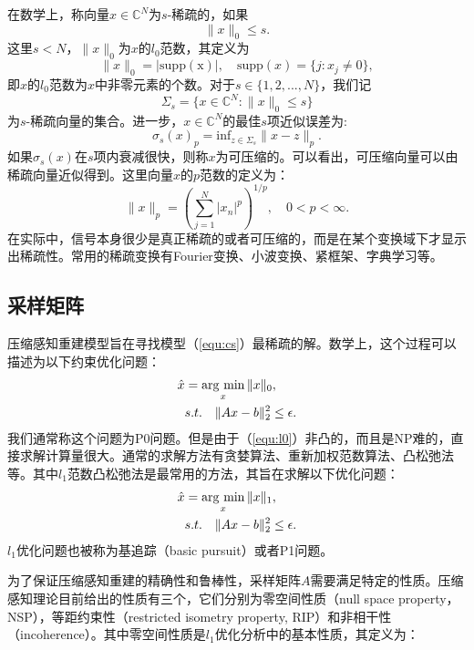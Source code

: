在数学上，称向量$x\in \mathbb{C}^N$为$s$-稀疏的，如果
\begin{equation}
	\|x\|_0 \leq s.
\end{equation}
这里$s<N$，$\|x\|_0$为$x$的$l_0$范数，其定义为
$$\|x\|_0=|\mathrm{supp(x)}|,\quad \mathrm{supp}(x)=\{j: x_j\neq 0\},$$
即$x$的$l_0$范数为$x$中非零元素的个数。对于$s\in \{1,2,...,N\}$，我们记
$$\Sigma_s=\{x\in\mathbb{C}^N: \|x\|_0\leq s\}$$
为$s$-稀疏向量的集合。进一步，$x\in \mathbb{C}^N$的最佳$s$项近似误差为:
$$\sigma_s(x)_p=\mathrm{inf}_{z\in \Sigma_s}\|x-z\|_p.$$
如果$\sigma_s(x)$在$s$项内衰减很快，则称$x$为可压缩的。可以看出，可压缩向量可以由稀疏向量近似得到。这里向量$x$的$p$范数的定义为：
\begin{equation}
	\|x\|_p = (\sum_{j=1}^N|x_n|^p)^{1/p},\quad 0<p<\infty.
\end{equation}
在实际中，信号本身很少是真正稀疏的或者可压缩的，而是在某个变换域下才显示出稀疏性。常用的稀疏变换有Fourier变换、小波变换、紧框架、字典学习等。

\subsection{采样矩阵}
压缩感知重建模型旨在寻找模型（\ref{equ:cs}）最稀疏的解。数学上，这个过程可以描述为以下约束优化问题：
\begin{equation}
\begin{aligned}
	\hat{x}&=\argmin_x \|x\|_0,\\
	&s.t.\quad \|Ax-b\|_2^2 \leq \epsilon.
\end{aligned}
\label{equ:l0}
\end{equation}
我们通常称这个问题为P0问题。但是由于（\ref{equ:l0}）非凸的，而且是NP难的，直接求解计算量很大。通常的求解方法有贪婪算法\cite{cosamp,tropp2006just}、重新加权范数算法\cite{gorodnitsky1997sparse,candes2008enhancing}、凸松弛法\cite{chen2001atomic}等。其中$l_1$范数凸松弛法是最常用的方法，其旨在求解以下优化问题：
\begin{equation}
\begin{aligned}
	\hat{x}&=\argmin_x \|x\|_1,\\
	&s.t.\quad \|Ax-b\|_2^2 \leq \epsilon.
\end{aligned}
\label{equ:l1}
\end{equation}
$l_1$优化问题也被称为基追踪（basic pursuit\cite{bp}）或者P1问题。

为了保证压缩感知重建的精确性和鲁棒性，采样矩阵$A$需要满足特定的性质。压缩感知理论目前给出的性质有三个，它们分别为零空间性质（null space property，NSP），等距约束性（restricted isometry property, RIP）和非相干性（incoherence）。其中零空间性质是$l_1$优化分析中的基本性质，其定义为：

